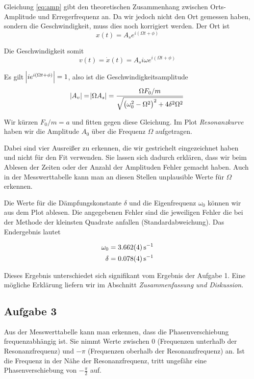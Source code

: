 \documentclass[a4paper,german,12pt,smallheadings]{scrartcl}
\begin{document}
\vspace{1cm}

Gleichung \ref{eq:amp} gibt den theoretischen Zusammenhang zwischen
Orts-Amplitude und Erregerfrequenz an. Da wir jedoch nicht den Ort gemessen
haben, sondern die Geschwindigkeit, muss dies noch korrigiert werden. Der Ort
ist
\begin{equation}
  x(t) = A_s e^{i(\Omega t + \phi)}
\end{equation}

Die Geschwindigkeit somit
\begin{equation}
  v(t) = \dot{x}(t) = A_s i \omega e^{i(\Omega t + \phi)}
\end{equation}

Es gilt $\envert{i e^{i(\Omega t + \phi)}} = 1$, also ist die
Geschwindigkeitsamplitude
\begin{equation}
  \envert{A_v} = \envert{\Omega A_s} = \frac{\Omega F_0 / m}{\sqrt{\del{\omega_0^2 - \Omega^2}^2 + 4 \delta^2 \Omega^2}}
\end{equation}

Wir kürzen $F_0 / m = a$ und fitten gegen diese Gleichung. Im Plot
\textit{Resonanzkurve} haben wir die Amplitude $A_0$ über die Frequenz $\Omega$
aufgetragen.

Dabei sind vier Ausreißer zu erkennen, die wir gestrichelt eingezeichnet haben
und nicht für den Fit verwenden. Sie lassen sich dadurch erklären, dass wir
beim Ablesen der Zeiten oder der Anzahl der Amplituden Fehler gemacht haben.
Auch in der Messwerttabelle kann man an diesen Stellen unplausible Werte für
$\Omega$ erkennen.

Die Werte für die Dämpfungskonstante $\delta$ und die Eigenfrequenz $\omega_0$
können wir aus dem Plot ablesen.  Die angegebenen Fehler sind die jeweiligen
Fehler die bei der Methode der kleinsten Quadrate anfallen
(Standardabweichung). Das Endergebnis lautet

\begin{align}
  \omega_0 &= \SI{3.662+-0.004}{s^{-1}} \\
  \delta &= \SI{0.078+-0.004}{s^{-1}}
\end{align}

Dieses Ergebnis unterschiedet sich signifikant vom Ergebnis der Aufgabe 1. Eine
mögliche Erklärung liefern wir im Abschnitt \textit{Zusammenfassung und
Diskussion}.

\subsection{Aufgabe 3}
Aus der Messwerttabelle kann man erkennen, dass die Phasenverschiebung
frequenzabhängig ist. Sie nimmt Werte zwischen $0$ (Frequenzen unterhalb der
Resonanzfrequenz) und $-\pi$ (Frequenzen oberhalb der Resonanzfrequenz) an. Ist
die Frequenz in der Nähe der Resonanzfrequenz, tritt ungefähr eine
Phasenverschiebung von $-\frac{\pi}{2}$ auf.
\end{document}
